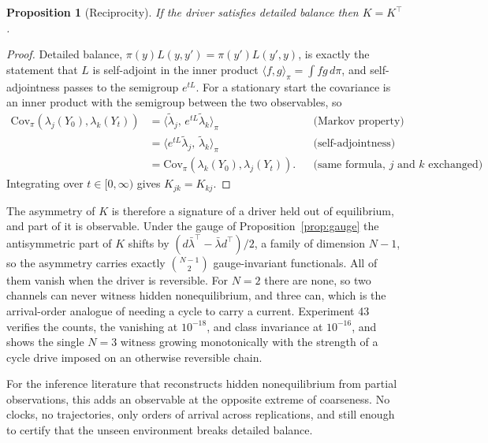 \documentclass[11pt]{article}
\newtheorem{proposition}{Proposition}
\theoremstyle{remark}
\newcommand{\lbar}{\bar{\lambda}}
\begin{document}
\begin{proposition}[Reciprocity]\label{prop:onsager}
If the driver satisfies detailed balance then $K = K^\top$.
\end{proposition}

\begin{proof}
Detailed balance, $\pi(y) L(y, y') = \pi(y') L(y', y)$, is exactly the
statement that $L$ is self-adjoint in the inner product
$\langle f, g\rangle_\pi = \int f g \, d\pi$, and self-adjointness
passes to the semigroup $e^{tL}$. For a stationary start the covariance is an
inner product with the semigroup between the two observables, so
\begin{align*}
  \mathrm{Cov}_\pi\!\left(\lambda_j(Y_0), \lambda_k(Y_t)\right)
  &= \langle \tilde\lambda_j,\, e^{tL}\tilde\lambda_k\rangle_\pi
  &&\text{(Markov property)}\\
  &= \langle e^{tL}\tilde\lambda_j,\, \tilde\lambda_k\rangle_\pi
  &&\text{(self-adjointness)}\\
  &= \mathrm{Cov}_\pi\!\left(\lambda_k(Y_0), \lambda_j(Y_t)\right).
  &&\text{(same formula, $j$ and $k$ exchanged)}
\end{align*}
Integrating over $t \in [0, \infty)$ gives $K_{jk} = K_{kj}$.
\end{proof}

The asymmetry of $K$ is therefore a signature of a driver held out of
equilibrium, and part of it is observable. Under the gauge of
Proposition~\ref{prop:gauge} the antisymmetric part of $K$ shifts by
$(d\lbar^\top - \lbar d^\top)/2$, a family of dimension $N-1$, so the
asymmetry carries exactly $\binom{N-1}{2}$ gauge-invariant functionals. All
of them vanish when the driver is reversible. For $N = 2$ there are none, so
two channels can never witness hidden nonequilibrium, and three can, which is
the arrival-order analogue of needing a cycle to carry a current. Experiment
43 verifies the counts, the vanishing at $10^{-18}$, and class invariance at
$10^{-16}$, and shows the single $N = 3$ witness growing monotonically with
the strength of a cycle drive imposed on an otherwise reversible chain.

For the inference literature that reconstructs hidden nonequilibrium from
partial observations, this adds an observable at the opposite extreme of
coarseness. No clocks, no trajectories, only orders of arrival across
replications, and still enough to certify that the unseen environment breaks
detailed balance.
\end{document}
